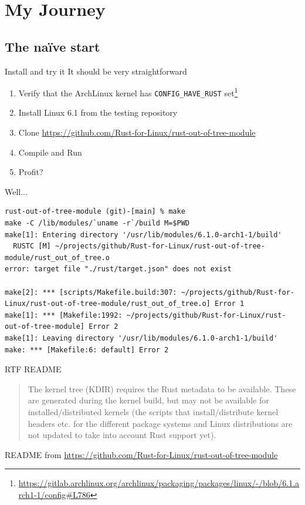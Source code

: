 \section{My Journey}

\subsection{The naïve start}

\begin{frame}[c,fragile]{Install and try it}
  It should be very straightforward
  \begin{enumerate}
    \item Verify that the ArchLinux kernel has \texttt{CONFIG\_HAVE\_RUST} set\footnote{\url{https://gitlab.archlinux.org/archlinux/packaging/packages/linux/-/blob/6.1.arch1-1/config\#L786}}
    \item Install Linux 6.1 from the testing repository
    \item Clone \url{https://github.com/Rust-for-Linux/rust-out-of-tree-module}
    \item Compile and Run
    \pause \item Profit?
  \end{enumerate}
\end{frame}

\begin{frame}[c,fragile]{Well...}
\begin{verbatim}
rust-out-of-tree-module (git)-[main] % make
make -C /lib/modules/`uname -r`/build M=$PWD
make[1]: Entering directory '/usr/lib/modules/6.1.0-arch1-1/build'
  RUSTC [M] ~/projects/github/Rust-for-Linux/rust-out-of-tree-module/rust_out_of_tree.o
error: target file "./rust/target.json" does not exist

make[2]: *** [scripts/Makefile.build:307: ~/projects/github/Rust-for-Linux/rust-out-of-tree-module/rust_out_of_tree.o] Error 1
make[1]: *** [Makefile:1992: ~/projects/github/Rust-for-Linux/rust-out-of-tree-module] Error 2
make[1]: Leaving directory '/usr/lib/modules/6.1.0-arch1-1/build'
make: *** [Makefile:6: default] Error 2
\end{verbatim}
\end{frame}

\begin{frame}[c,fragile]{RTF README}
\begin{quote}
The kernel tree (KDIR) requires the Rust metadata to be available. These are
generated during the kernel build, but may not be available for
installed/distributed kernels (the scripts that install/distribute kernel
headers etc. for the different package systems and Linux distributions are not
updated to take into account Rust support yet).
\end{quote}
README from \url{https://github.com/Rust-for-Linux/rust-out-of-tree-module}
\end{frame}

